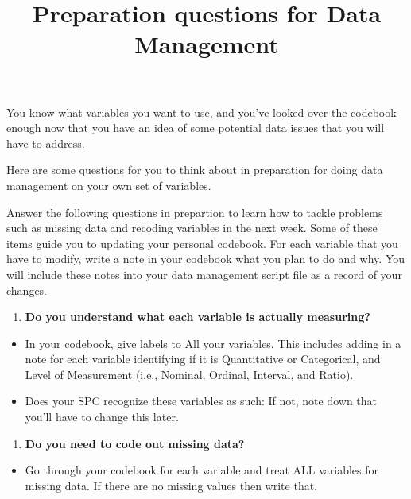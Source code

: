 \documentclass[]{article}
\title{Preparation questions for Data Management}
\author{}
\date{}
\providecommand{\tightlist}{%
  \setlength{\itemsep}{0pt}\setlength{\parskip}{0pt}}
\begin{document}
\maketitle

You know what variables you want to use, and you've looked over the
codebook enough now that you have an idea of some potential data issues
that you will have to address.

Here are some questions for you to think about in preparation for doing
data management on your own set of variables.

Answer the following questions in prepartion to learn how to tackle
problems such as missing data and recoding variables in the next week.
Some of these items guide you to updating your personal codebook. For
each variable that you have to modify, write a note in your codebook
what you plan to do and why. You will include these notes into your data
management script file as a record of your changes.

\begin{enumerate}
\def\labelenumi{\arabic{enumi}.}
\tightlist
\item
  \textbf{Do you understand what each variable is actually measuring?}
\end{enumerate}

\begin{itemize}
\tightlist
\item
  In your codebook, give labels to All your variables. This includes
  adding in a note for each variable identifying if it is Quantitative
  or Categorical, and Level of Measurement (i.e., Nominal, Ordinal,
  Interval, and Ratio).
\item
  Does your SPC recognize these variables as such: If not, note down
  that you'll have to change this later.
\end{itemize}

\begin{enumerate}
\def\labelenumi{\arabic{enumi}.}
\setcounter{enumi}{1}
\tightlist
\item
  \textbf{Do you need to code out missing data?}
\end{enumerate}

\begin{itemize}
\tightlist
\item
  Go through your codebook for each variable and treat ALL variables for
  missing data. If there are no missing values then write that.
\end{itemize}
\end{document}
